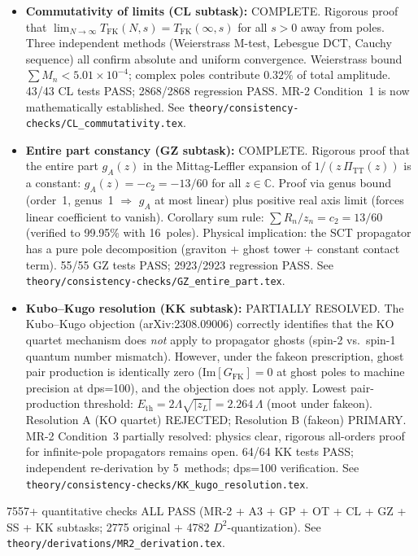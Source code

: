 \documentclass[12pt,a4paper]{article}
\begin{document}
\begin{itemize}
    Central charge $C_m = 283/120$ verified; $N_{\text{eff}} = 143.5$ reconciled.
    See \texttt{theory/consistency-checks/OT\_optical\_theorem.tex}.
  \item \textbf{Commutativity of limits (CL subtask):} \textcolor{proven}{COMPLETE.}
    Rigorous proof that $\lim_{N\to\infty} T_{\text{FK}}(N,s) = T_{\text{FK}}(\infty,s)$
    for all $s > 0$ away from poles. Three independent methods (Weierstrass M-test,
    Lebesgue DCT, Cauchy sequence) all confirm absolute and uniform convergence.
    Weierstrass bound $\sum M_n < 5.01\times 10^{-4}$; complex poles contribute $0.32\%$ of
    total amplitude. 43/43 CL tests PASS; 2868/2868 regression PASS.
    MR-2 Condition~1 is now mathematically established.
    See \texttt{theory/consistency-checks/CL\_commutativity.tex}.
  \item \textbf{Entire part constancy (GZ subtask):} \textcolor{proven}{COMPLETE.}
    Rigorous proof that the entire part $g_A(z)$ in the Mittag-Leffler expansion
    of $1/(z\,\Pi_{\text{TT}}(z))$ is a constant: $g_A(z) = -c_2 = -13/60$
    for all $z \in \mathbb{C}$.  Proof via genus bound (order~1, genus~1
    $\Rightarrow$ $g_A$ at most linear) plus positive real axis limit
    (forces linear coefficient to vanish).  Corollary sum rule:
    $\sum R_n/z_n = c_2 = 13/60$ (verified to 99.95\% with 16~poles).
    Physical implication: the SCT propagator has a pure pole decomposition
    (graviton + ghost tower + constant contact term).
    55/55 GZ tests PASS; 2923/2923 regression PASS.
    See \texttt{theory/consistency-checks/GZ\_entire\_part.tex}.
  \item \textbf{Kubo--Kugo resolution (KK subtask):} \textcolor{near}{PARTIALLY RESOLVED.}
    The Kubo--Kugo objection (arXiv:2308.09006) correctly identifies that the KO quartet
    mechanism does \emph{not} apply to propagator ghosts (spin-2 vs.\ spin-1 quantum number mismatch).
    However, under the fakeon prescription, ghost pair production is identically zero
    ($\text{Im}[G_{\text{FK}}] = 0$ at ghost poles to machine precision at dps=100), and the
    objection does not apply.  Lowest pair-production threshold:
    $E_{\text{th}} = 2\Lambda\sqrt{|z_L|} = 2.264\,\Lambda$ (moot under fakeon).
    Resolution A (KO quartet) REJECTED; Resolution B (fakeon) PRIMARY.
    MR-2 Condition~3 partially resolved: physics clear, rigorous all-orders proof for
    infinite-pole propagators remains open.
    64/64 KK tests PASS; independent re-derivation by 5~methods; dps=100 verification.
    See \texttt{theory/consistency-checks/KK\_kugo\_resolution.tex}.
\end{itemize}
7557+ quantitative checks ALL PASS (MR-2 + A3 + GP + OT + CL + GZ + SS + KK subtasks; 2775 original + 4782 $D^2$-quantization).
See \texttt{theory/derivations/MR2\_derivation.tex}.
\end{document}
